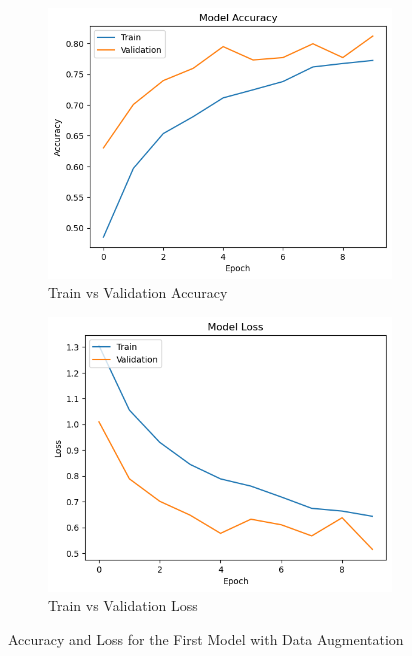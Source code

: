 \begin{figure}[H]
    \centering
    \begin{subfigure}[t]{0.45\textwidth} %
        \centering
        \includegraphics[width=\textwidth]{images/modelo_aula_accuracy_dataaug.png}
        \caption{Train vs Validation Accuracy}
        \label{fig:subfig1}
    \end{subfigure}
    \hfill
    \begin{subfigure}[t]{0.45\textwidth}
        \centering
        \includegraphics[width=\textwidth]{images/modelo_aula_loss_dataaug.png}
        \caption{Train vs Validation Loss}
        \label{fig:subfig2}
    \end{subfigure}
    \caption{Accuracy and Loss for the First Model with Data Augmentation}
    \label{fig:images}
\end{figure}

